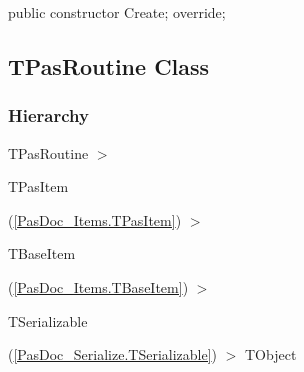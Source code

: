 \documentclass{report}
\newif\ifpdf
\begin{document}
\label{PasDoc_Items.TPasEnum-Create}
\begin{list}{}{
\setlength{\itemindent}{0cm}
\setlength{\listparindent}{0cm}
\setlength{\leftmargin}{\evensidemargin}
\addtolength{\leftmargin}{\tmplength}
\settowidth{\labelsep}{X}
\addtolength{\leftmargin}{\labelsep}
\setlength{\labelwidth}{\tmplength}
}
\item[\textbf{Declaration}\hfill]
\ifpdf
\begin{flushleft}
\fi
\begin{ttfamily}
public constructor Create; override;\end{ttfamily}

\ifpdf
\end{flushleft}
\fi

\end{list}
\ifpdf
\subsection*{\large{\textbf{TPasRoutine Class}}\normalsize\hspace{1ex}\hrulefill}
\else
\subsection*{TPasRoutine Class}
\fi
\label{PasDoc_Items.TPasRoutine}
\subsubsection*{\large{\textbf{Hierarchy}}\normalsize\hspace{1ex}\hfill}
TPasRoutine {$>$} \begin{ttfamily}TPasItem\end{ttfamily}(\ref{PasDoc_Items.TPasItem}) {$>$} \begin{ttfamily}TBaseItem\end{ttfamily}(\ref{PasDoc_Items.TBaseItem}) {$>$} \begin{ttfamily}TSerializable\end{ttfamily}(\ref{PasDoc_Serialize.TSerializable}) {$>$} 
TObject
\end{document}
